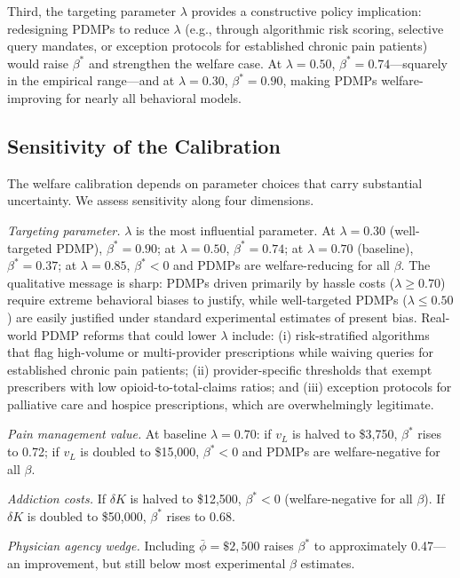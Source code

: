 \documentclass[12pt]{article}
\begin{document}
Third, the targeting parameter $\lambda$ provides a constructive policy implication: redesigning PDMPs to reduce $\lambda$ (e.g., through algorithmic risk scoring, selective query mandates, or exception protocols for established chronic pain patients) would raise $\beta^*$ and strengthen the welfare case. At $\lambda = 0.50$, $\beta^* = 0.74$---squarely in the empirical range---and at $\lambda = 0.30$, $\beta^* = 0.90$, making PDMPs welfare-improving for nearly all behavioral models.

\subsection{Sensitivity of the Calibration}\label{sec:welfare_sensitivity}

The welfare calibration depends on parameter choices that carry substantial uncertainty. We assess sensitivity along four dimensions.

\textit{Targeting parameter.} $\lambda$ is the most influential parameter. At $\lambda = 0.30$ (well-targeted PDMP), $\beta^* = 0.90$; at $\lambda = 0.50$, $\beta^* = 0.74$; at $\lambda = 0.70$ (baseline), $\beta^* = 0.37$; at $\lambda = 0.85$, $\beta^* < 0$ and PDMPs are welfare-reducing for all $\beta$. The qualitative message is sharp: PDMPs driven primarily by hassle costs ($\lambda \geq 0.70$) require extreme behavioral biases to justify, while well-targeted PDMPs ($\lambda \leq 0.50$) are easily justified under standard experimental estimates of present bias. Real-world PDMP reforms that could lower $\lambda$ include: (i) risk-stratified algorithms that flag high-volume or multi-provider prescriptions while waiving queries for established chronic pain patients; (ii) provider-specific thresholds that exempt prescribers with low opioid-to-total-claims ratios; and (iii) exception protocols for palliative care and hospice prescriptions, which are overwhelmingly legitimate.

\textit{Pain management value.} At baseline $\lambda = 0.70$: if $v_L$ is halved to \$3,750, $\beta^*$ rises to 0.72; if $v_L$ is doubled to \$15,000, $\beta^* < 0$ and PDMPs are welfare-negative for all $\beta$.

\textit{Addiction costs.} If $\delta K$ is halved to \$12,500, $\beta^* < 0$ (welfare-negative for all $\beta$). If $\delta K$ is doubled to \$50,000, $\beta^*$ rises to 0.68.

\textit{Physician agency wedge.} Including $\bar{\phi} = \$2{,}500$ raises $\beta^*$ to approximately 0.47---an improvement, but still below most experimental $\beta$ estimates.
\end{document}
